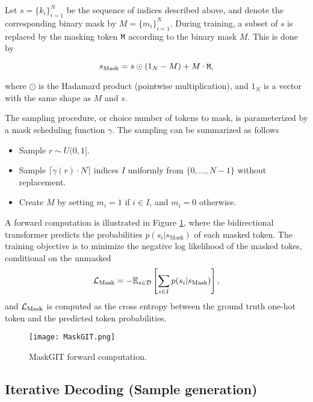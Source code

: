\documentclass[../../thesis.tex]{subfiles}
\begin{document}
Let $s = \{k_i\}_{i=1}^N$ be the sequence of indices described above, and denote the corresponding binary mask by $M = \{m_i\}_{i=1}^N$. During training, a subset of $s$ is replaced by the masking token $\texttt{M}$ according to the binary mask $M$. This is done by 

\begin{equation}
    s_\text{Mask} = s\odot (1_N-M) +  M\cdot\texttt{M},
\end{equation}

where $\odot$ is the Hadamard product (pointwise multiplication), and $1_N$ is a vector with the same shape as $M$ and $s$.\newline

The sampling procedure, or choice number of tokens to mask, is parameterized by a mask scheduling function $\gamma$. The sampling can be summarized as follows

\begin{itemize}
    \item Sample $r \sim U(0,1]$.
    \item Sample $\lceil \gamma(r)\cdot N \rceil$ indices $I$ uniformly from $\{0,\dots,N-1\}$ without replacement. 
    \item Create $M$ by setting $m_i = 1$ if $i\in I$, and $m_i = 0$ otherwise.
\end{itemize}

A forward computation is illustrated in Figure \ref{fig:MaskGIT}, where the bidirectional transformer predicts the probabilities $p(s_i|s_\text{Mask})$ of each masked token. The training objective is to minimize the negative log likelihood of the masked tokes, conditional on the unmasked
\begin{equation}
    \mathcal{L}_\text{Mask} = -\mathbb{E}_{s\in \mathcal{D}}\left[\sum_{i \in I} p(s_i|s_\text{Mask} ) \right],
\end{equation}
and $\mathcal{L}_\text{Mask}$ is computed as the cross entropy between the ground truth one-hot token and the predicted token probabilities. 

\begin{figure}[h]
    \texttt{[image: MaskGIT.png]}
    \centering 
    \caption{MaskGIT forward computation.}
    \label{fig:MaskGIT}
\end{figure}


\subsection{Iterative Decoding (Sample generation)}
\end{document}
